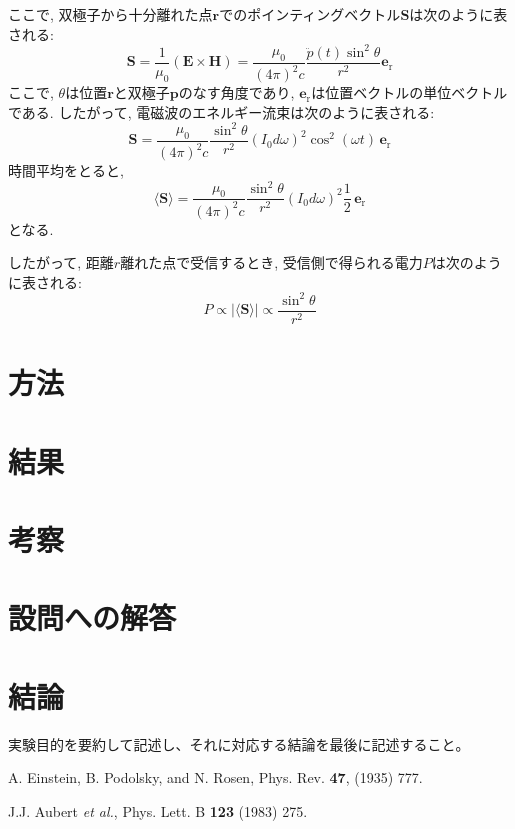 \documentclass[uplatex,dvipdfmx,a4j,12pt]{jsarticle}
\begin{document}
ここで, 双極子から十分離れた点$\mathbf{r}$でのポインティングベクトル$\mathbf{S}$は次のように表される:
\begin{equation}
  \mathbf{S} = \frac{1}{\mu_0}\left(\mathbf{E} \times \mathbf{H}\right) =
  \frac{\mu_0}{(4\pi)^2c} \frac{\ddot{p}(t)\sin^2\theta}{r^2}\mathbf{e}_\mathrm{r}
\end{equation}
ここで, $\theta$は位置$\mathbf{r}$と双極子$\mathbf{p}$のなす角度であり, $\mathbf{e}_\mathrm{r}$は位置ベクトルの単位ベクトルである.
したがって, 電磁波のエネルギー流束は次のように表される:
\begin{equation}
  \mathbf{S} = \frac{\mu_0}{(4\pi)^2c} \frac{\sin^2\theta}{r^2}(I_0 d \omega)^2 \cos^2\left(\omega t\right)\,\mathbf{e}_\mathrm{r}
\end{equation}
時間平均をとると,
\begin{equation}
  \langle \mathbf{S} \rangle = \frac{\mu_0}{(4\pi)^2c} \frac{\sin^2\theta}{r^2}(I_0 d \omega)^2 \frac{1}{2}\,\mathbf{e}_\mathrm{r}
\end{equation}
となる.

したがって, 距離$r$離れた点で受信するとき, 受信側で得られる電力$P$は次のように表される:
\begin{equation}
  P \propto |\langle \mathbf{S} \rangle| \propto \frac{\sin^2\theta}{r^2}
\end{equation}


\section{方法}

\section{結果}

\section{考察}

\section{設問への解答}


\section{結論}

実験目的を要約して記述し、それに対応する結論を最後に記述すること。

\begin{thebibliography}{9}

        A. Einstein, B. Podolsky, and N. Rosen, 
        Phys. Rev. \textbf{47}, (1935) 777.

        J.J. Aubert \textit{et al.},
        Phys. Lett. B \textbf{123} (1983) 275.
    
\end{thebibliography}
\end{document}
